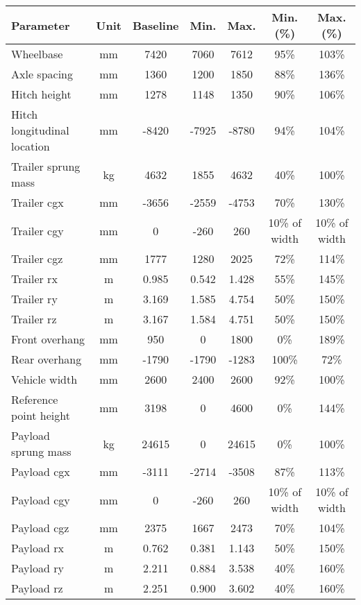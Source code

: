 \begin{table}[H]
	\centering\footnotesize
	\begin{threeparttable}

		\begin{tabulary}{\textwidth}{lcccccc}
			\toprule
			\textbf{Parameter} & \textbf{Unit} & \textbf{Baseline} & \textbf{Min.} & \textbf{Max.} & \textbf{Min. (\%)} & \textbf{Max. (\%)} \\

			\midrule
			Wheelbase & mm & 7420  & 7060  & 7612  & 95\%  & 103\% \\
			Axle spacing & mm    & 1360  & 1200  & 1850  & 88\%  & 136\% \\
			Hitch height & mm    & 1278  & 1148  & 1350  & 90\%  & 106\% \\
			Hitch longitudinal location & mm    & -8420  & -7925  & -8780  & 94\%  & 104\% \\
			Trailer sprung mass & kg    & 4632  & 1855  & 4632  & 40\%  & 100\% \\
			Trailer \gls{cgx} & mm    & -3656  & -2559  & -4753  & 70\%  & 130\% \\
			Trailer \gls{cgy} & mm    & 0     & -260  & 260   & 10\% of width & 10\% of width \\
			Trailer \gls{cgz} & mm    & 1777  & 1280  & 2025  & 72\%  & 114\% \\
			Trailer \gls{rx} & m     & 0.985 & 0.542 & 1.428 & 55\%  & 145\% \\
			Trailer \gls{ry} & m     & 3.169 & 1.585 & 4.754 & 50\%  & 150\% \\
			Trailer \gls{rz} & m     & 3.167 & 1.584 & 4.751 & 50\%  & 150\% \\
			Front overhang & mm & 950   & 0     & 1800  & 0\%   & 189\% \\
			Rear overhang & mm & -1790 & -1790 & -1283 & 100\% & 72\% \\
			Vehicle width & mm    & 2600  & 2400  & 2600  & 92\%  & 100\% \\
			Reference point height & mm    & 3198  & 0     & 4600  & 0\%   & 144\% \\
			Payload sprung mass & kg    & 24615 & 0     & 24615 & 0\%   & 100\% \\
			Payload \gls{cgx} & mm    & -3111  & -2714  & -3508  & 87\%  & 113\% \\
			Payload \gls{cgy} & mm    & 0     & -260  & 260   & 10\% of width & 10\% of width \\
			Payload \gls{cgz} & mm    & 2375  & 1667  & 2473  & 70\%  & 104\% \\
			Payload \gls{rx} & m     & 0.762 & 0.381 & 1.143 & 50\%  & 150\% \\
			Payload \gls{ry} & m     & 2.211 & 0.884 & 3.538 & 40\%  & 160\% \\
			Payload \gls{rz} & m     & 2.251 & 0.900 & 3.602 & 40\%  & 160\% \\


\end{tabulary}
\end{threeparttable}
\end{table}

